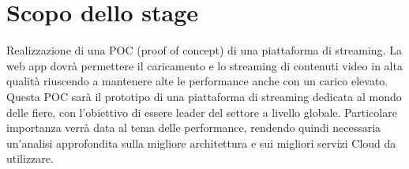 \section*{Scopo dello stage}
Realizzazione di una POC (proof of concept) di una piattaforma di streaming. La web app dovrà permettere il caricamento e lo streaming di contenuti video in alta qualità riuscendo a mantenere alte le performance anche con un carico elevato.
Questa POC sarà il prototipo di una piattaforma di streaming dedicata al mondo delle fiere, con l'obiettivo di essere leader del settore a livello globale.
Particolare importanza verrà data al tema delle performance, rendendo quindi necessaria un'analisi approfondita sulla migliore architettura e sui migliori servizi Cloud da utilizzare.



